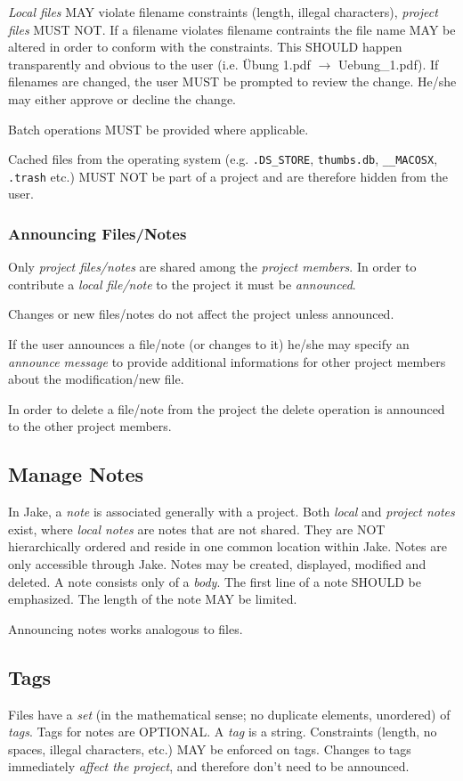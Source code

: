 \emph{Local files} MAY violate filename constraints (length, illegal characters), \emph{project files} MUST NOT. If a filename violates filename contraints  the file name MAY be altered in order to conform with the constraints. This SHOULD happen transparently and obvious to the user (i.e. Übung 1.pdf $\rightarrow$ Uebung\_1.pdf). If filenames are changed, the user MUST be prompted to review the change. He/she may either approve or decline the change.

Batch operations MUST be provided where applicable.

Cached files from the operating system (e.g. \texttt{.DS\_STORE}, \texttt{thumbs.db}, \texttt{\_\_MACOSX}, \texttt{.trash} etc.) MUST NOT be part of a project and are therefore hidden from the user.

\subsubsection{Announcing Files/Notes}
Only \emph{project files/notes} are shared among the \emph{project members}. In order to contribute a \emph{local file/note} to the project it must be \emph{announced}.

Changes or new files/notes do not affect the project unless announced.

If the user announces a file/note (or changes to it) he/she may specify an \emph{announce message} to provide additional informations for other project members about the modification/new file.

In order to delete a file/note from the project the delete operation is announced to the other project members.

\subsection{Manage Notes}
In Jake, a \emph{note} is associated generally with a project. Both \emph{local} and \emph{project notes} exist, where \emph{local notes} are notes that are not shared. They are NOT hierarchically ordered and reside in one common location within Jake. Notes are only accessible through Jake. Notes may be created, displayed, modified and deleted.
A note consists only of a \emph{body}. The first line of a note SHOULD be emphasized. The length of the note MAY be limited.

Announcing notes works analogous to files.

\subsection{Tags}
Files have a \emph{set} (in the mathematical sense; no duplicate elements, unordered) of \emph{tags}. Tags for notes are OPTIONAL. A \emph{tag} is a string. Constraints (length, no spaces, illegal characters, etc.) MAY be enforced on tags. Changes to tags immediately \emph{affect the project}, and therefore don't need to be announced.

